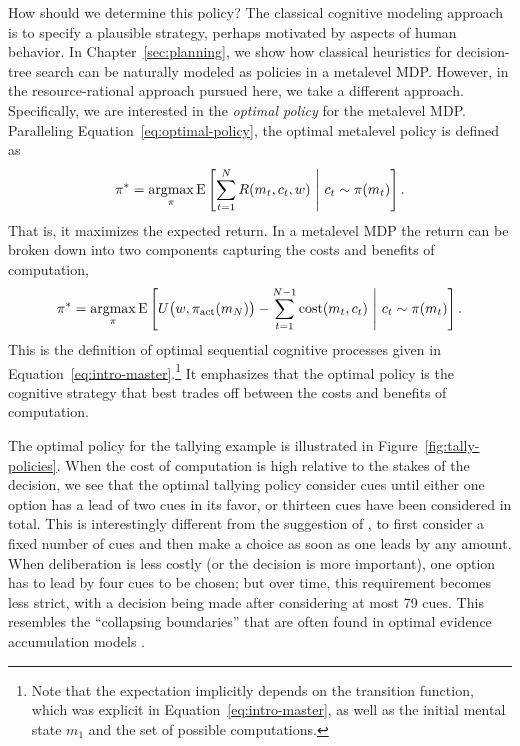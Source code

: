 How should we determine this policy? The classical cognitive modeling approach is to specify a plausible strategy, perhaps motivated by aspects of human behavior. In Chapter~\ref{sec:planning}, we show how classical heuristics for decision-tree search can be naturally modeled as policies in a metalevel MDP. However, in the resource-rational approach pursued here, we take a different approach. Specifically, we are interested in the \emph{optimal policy} for the metalevel MDP. Paralleling Equation~\ref{eq:optimal-policy}, the optimal metalevel policy is defined as
%
\begin{equation}\label{eq:optimal-meta-policy}
  \pi^* = \argmax_\pi \expect{
    \sum_{t=1}^{\tmax} R(m_t, c_t, w)
  }{
    c_t \sim \pi(m_t)
  }.
\end{equation}
That is, it maximizes the expected return. In a metalevel MDP the return can be broken down into two components capturing the costs and benefits of computation,
\begin{equation}\label{eq:optimal-meta-policy-expanded}
  \pi^* = \argmax_\pi \expect{
    \Uterm[m_N] -
      \sum_{t=1}^{\tmax-1} \cost(m_t, c_t)
  }{
    c_t \sim \pi(m_t)
  }.
\end{equation}
This is the definition of optimal sequential cognitive processes given in Equation~\ref{eq:intro-master}.\footnote{%
  Note that the expectation implicitly depends on the transition function, which was explicit in Equation~\ref{eq:intro-master}, as well as the initial mental state $m_1$ and the set of possible computations.
} It emphasizes that the optimal policy is the cognitive strategy that best trades off between the costs and benefits of computation.

The optimal policy for the tallying example is illustrated in Figure~\ref{fig:tally-policies}. When the cost of computation is high relative to the stakes of the decision, we see that the optimal tallying policy consider cues until either one option has a lead of two cues in its favor, or thirteen cues have been considered in total. This is interestingly different from the suggestion of \citet{gigerenzer2011heuristic}, to first consider a fixed number of cues and then make a choice as soon as one leads by any amount. When deliberation is less costly (or the decision is more important), one option has to lead by four cues to be chosen; but over time, this requirement becomes less strict, with a decision being made after considering at most 79 cues. This resembles the ``collapsing boundaries'' that are often found in optimal evidence accumulation models \citep{drugowitsch2012cost}.

